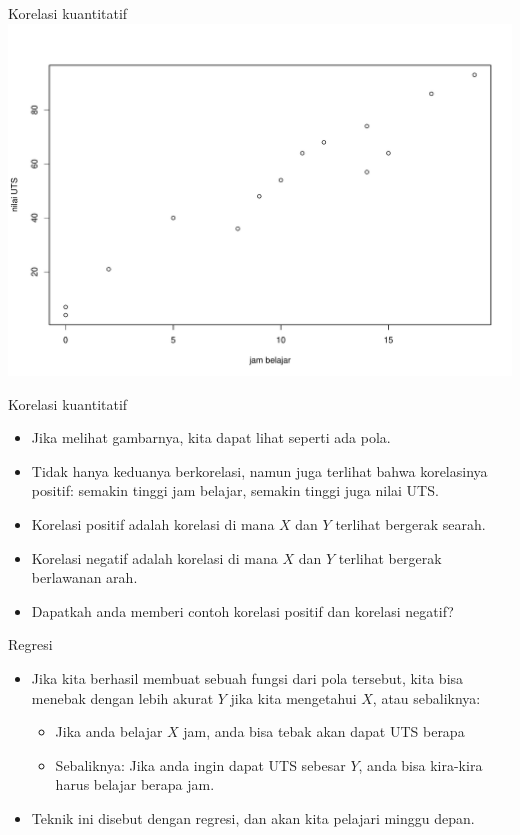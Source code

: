 \documentclass[
  ignorenonframetext,
]{beamer}
\begin{document}
\begin{frame}{Korelasi kuantitatif}
\label{korelasi-kuantitatif-3}
\includegraphics{index_files/figure-beamer/unnamed-chunk-20-1.pdf}
\end{frame}

\begin{frame}{Korelasi kuantitatif}
\label{korelasi-kuantitatif-4}
\begin{itemize}
\item
  Jika melihat gambarnya, kita dapat lihat seperti ada pola.
\item
  Tidak hanya keduanya berkorelasi, namun juga terlihat bahwa
  korelasinya positif: semakin tinggi jam belajar, semakin tinggi juga
  nilai UTS.
\item
  Korelasi positif adalah korelasi di mana \(X\) dan \(Y\) terlihat
  bergerak searah.
\item
  Korelasi negatif adalah korelasi di mana \(X\) dan \(Y\) terlihat
  bergerak berlawanan arah.
\item
  Dapatkah anda memberi contoh korelasi positif dan korelasi negatif?
\end{itemize}
\end{frame}

\begin{frame}{Regresi}
\label{regresi}
\begin{itemize}
\item
  Jika kita berhasil membuat sebuah fungsi dari pola tersebut, kita bisa
  menebak dengan lebih akurat \(Y\) jika kita mengetahui \(X\), atau
  sebaliknya:

  \begin{itemize}
  \item
    Jika anda belajar \(X\) jam, anda bisa tebak akan dapat UTS berapa
  \item
    Sebaliknya: Jika anda ingin dapat UTS sebesar \(Y\), anda bisa
    kira-kira harus belajar berapa jam.
  \end{itemize}
\item
  Teknik ini disebut dengan regresi, dan akan kita pelajari minggu
  depan.
\end{itemize}
\end{frame}
\end{document}
